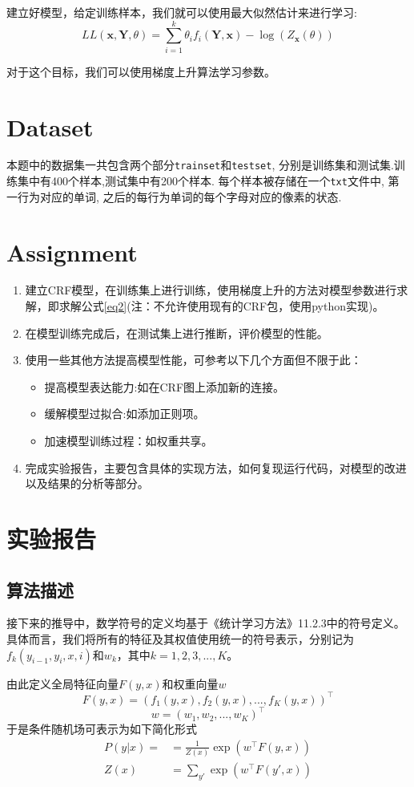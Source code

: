 \documentclass[a4paper,UTF8]{article}
\numberwithin{equation}{section}
\begin{document}
建立好模型，给定训练样本，我们就可以使用最大似然估计来进行学习:
\begin{equation}
    LL(\mathbf{x},\mathbf{Y},\theta) =\sum_{i=1}^{k} \theta_{i} f_{i}(\mathbf{Y}, \mathbf{x}) -\log \left(Z_{\mathbf{x}}(\theta)\right)\label{eq2}
\end{equation}

对于这个目标，我们可以使用梯度上升算法学习参数。

\section{Dataset}
本题中的数据集一共包含两个部分\texttt{trainset}和\texttt{testset}, 分别是训练集和测试集.训练集中有400个样本,测试集中有200个样本. 每个样本被存储在一个\texttt{txt}文件中, 第一行为对应的单词, 之后的每行为单词的每个字母对应的像素的状态.

\section{Assignment}
\begin{enumerate}
    \item 建立CRF模型，在训练集上进行训练，使用梯度上升的方法对模型参数进行求解，即求解公式\eqref{eq2}(注：不允许使用现有的CRF包，使用python实现)。
    \item 在模型训练完成后，在测试集上进行推断，评价模型的性能。
    \item 使用一些其他方法提高模型性能，可参考以下几个方面但不限于此：
    \begin{itemize}
        \item 提高模型表达能力:如在CRF图上添加新的连接。
        \item 缓解模型过拟合:如添加正则项。
        \item 加速模型训练过程：如权重共享。
    \end{itemize}
    \item 完成实验报告，主要包含具体的实现方法，如何复现运行代码，对模型的改进以及结果的分析等部分。
\end{enumerate}
\section {实验报告}

\subsection{算法描述}
\par 接下来的推导中，数学符号的定义均基于《统计学习方法》11.2.3中的符号定义。具体而言，我们将所有的特征及其权值使用统一的符号表示，分别记为$f_k(y_{i-1}, y_i, x, i)$和$w_k$，其中$k=1,2,3,...,K$。
\par 由此定义全局特征向量$F(y, x)$和权重向量$w$
$$F(y, x)=\left(f_1(y, x), f_2(y, x), ...,f_K(y, x)\right)^\top$$
$$w=\left(w_1, w_2, ..., w_K\right)^\top$$
于是条件随机场可表示为如下简化形式
$$
\begin{aligned}
    P(y|x)=&=\frac 1{Z(x)}\exp(w^\top F(y, x))\\
    Z(x)&=\sum_{y'}\exp(w^\top F(y', x))
\end{aligned}
$$
\end{document}
